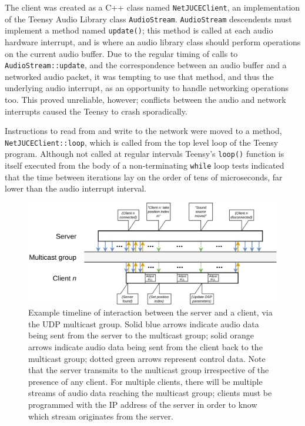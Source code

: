 The client was created as a C++ class named \texttt{NetJUCEClient}, an
implementation of the Teensy Audio Library class \texttt{AudioStream}.
\texttt{AudioStream} descendents must implement a method named
\texttt{update()}; this method is called at each audio hardware interrupt, and
is where an audio library class should perform operations on the current
audio buffer.
Due to the regular timing of calls to \texttt{AudioStream::update}, and the
correspondence between an audio buffer and a networked audio packet, it was
tempting to use that method, and thus the underlying audio interrupt, as an
opportunity to handle networking operations too.
This proved unreliable, however; conflicts between the audio and network
interrupts caused the Teensy to crash sporadically.

Instructions to read from and write to the network were moved to a method,
\texttt{NetJUCEClient::loop}, which is called from the top level loop of
the Teensy program.
Although not called at regular intervals \textemdash{} Teensy's \texttt{loop()}
function is itself executed from the body of a non-terminating \texttt{while}
loop \textemdash{} tests indicated that the time between iterations lay on the
order of tens of microseconds, far lower than the audio interrupt interval.

\begin{figure}[ht]
    \centering
    \includegraphics[width=\textwidth]{figures/timeline}
    \caption{
        Example timeline of interaction between the server and a client, via the
        UDP multicast group.
        Solid blue arrows indicate audio data being sent from the server to the
        multicast group;
        solid orange arrows indicate audio data being sent from the client back
        to the multicast group;
        dotted green arrows represent control data.
        Note that the server transmits to the multicast group irrespective of
        the presence of any client.
        For multiple clients, there will be multiple streams of audio data
        reaching the multicast group; clients must be programmed with the IP
        address of the server in order to know which stream originates from the
        server.
    }
    \label{fig:timeline}
\end{figure}

